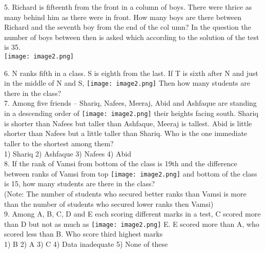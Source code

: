 \documentclass[
]{article}
\begin{document}
5. Richard is fifteenth from the front in a column of boys. There were thrice as many behind him as there were in front. How many boys are there between Richard and the seventh boy from the end of the col
umn? In the question the number of boys between then is asked which according to the solution of the test is 35.\\
\texttt{[image: image2.png]}

6. N ranks fifth in a class. S is eighth from the last. If T is sixth after N and just in the middle of N and S, \texttt{[image: image2.png]}
Then how many students are there in the class?\\

7. Among five friends – Shariq, Nafees, Meeraj, Abid and Ashfaque are standing in a descending order of \texttt{[image: image2.png]}
their heights facing south. Shariq is shorter than Nafees but taller than Ashfaque, Meeraj is tallest. Abid is little shorter than Nafees but a little taller than Shariq. Who is the one immediate taller to the shortest among them?\\
1) Shariq \hspace{2mm}2) Ashfaque \hspace{2mm}3) Nafees \hspace{2mm}4) Abid\\

8. If the rank of Vamsi from bottom of the class is 19th and the difference between ranks of Vamsi from top  \texttt{[image: image2.png]}
and bottom of the class is 15, how many students are there in the class?\\
(Note: The number of students who secured better ranks than Vamsi is more than the number of students who secured lower ranks then Vamsi)\\

9. Among A, B, C, D and E each scoring different marks in a test, C scored more than D but not as much as \texttt{[image: image2.png]}
E. E scored more than A, who scored less than B. Who score third highest marks\\
1) B \hspace{2mm}2) A \hspace{2mm}3) C
\hspace{2mm}4) Data inadequate \hspace{2mm}5) None of these\\
\end{document}

